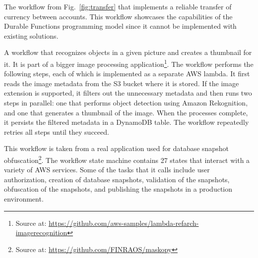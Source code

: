 
The workflow from Fig.~\ref{fig:transfer} that implements a reliable transfer of currency between accounts. This workflow showcases the capabilities of the Durable Functions programming model since it cannot be implemented with existing solutions.
%

%
A workflow that recognizes objects in a given picture and creates a thumbnail for it. It is part of a bigger image processing application\footnote{Source at: \url{https://github.com/aws-samples/lambda-refarch-imagerecognition}}. %
The workflow performs the following steps, each of which is implemented as a separate AWS lambda. It first reads the image metadata from the S3 bucket where it is stored. If the image extension is supported, it filters out the unnecessary metadata and then runs two steps in parallel: one that performs object detection using Amazon Rekognition, and one that generates a thumbnail of the image. When the processes complete, it persists the filtered metadata in a DynamoDB table. The workflow repeatedly retries all steps until they succeed. 

%
This workflow is taken from a real application used for database snapshot obfuscation\footnote{Source at: \url{https://github.com/FINRAOS/maskopy}}. The workflow state machine contains 27 states that interact with a variety of AWS services. Some of the tasks that it calls include user authorization, creation of database snapshots, validation of the snapshots, obfuscation of the snapshots, and publishing the snapshots in a production environment. 

